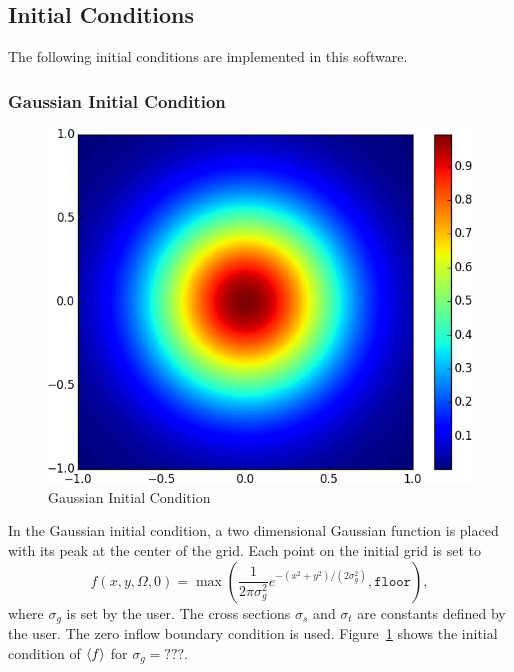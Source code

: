 \documentclass{article}
\newcommand{\kinetic}{\texttt{kinetic}\xspace}
\newcommand{\moment}{\texttt{moment}\xspace}
\newcommand{\momopt}{\texttt{momopt}\xspace}
\begin{document}

\subsection{Initial Conditions}
\label{subsec:initcond}
\FloatBarrier
The following initial conditions are implemented in this software.

\subsubsection{Gaussian Initial Condition}
\begin{figure}
    \centering
    \includegraphics[height=0.3\textheight]{initcond_gaussian.png}
    \caption{Gaussian Initial Condition}
    \label{fig:gaussian_ic}
\end{figure}
In the Gaussian initial condition, a two dimensional Gaussian function
is placed with its peak at the center of the grid. Each point on the
initial grid is set to
\begin{equation}
    f(x,y,\Omega,0) = \max \left( \frac{1}{2 \pi \sigma_g^2} e^{-(x^2 + y^2) / (2 \sigma_g^2)}, \texttt{floor} \right), 
\end{equation}
where $\sigma_g$ is set by the user.
The cross sections $\sigma_s$ and $\sigma_t$ are constants defined by the user.
The zero inflow boundary condition is used.
Figure~\ref{fig:gaussian_ic} shows the initial condition of $\langle f \rangle$ for $\sigma_g = ???$. 
\end{document}
